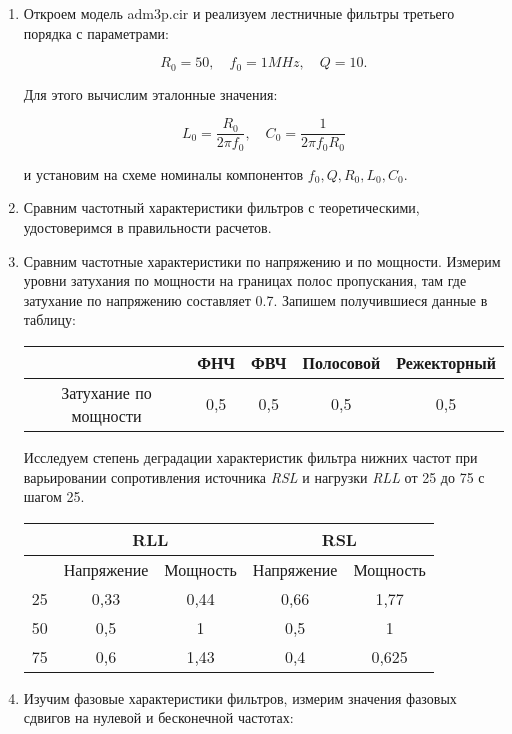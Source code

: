 \documentclass[a4paper, 12pt]{article}%
\begin{document}
\begin{enumerate}

\item Откроем модель adm3p.cir и реализуем лестничные фильтры третьего порядка с параметрами:

\[R_0 = 50, \quad f_0 = 1MHz, \quad Q = 10.\]

Для этого вычислим эталонные значения:

\[L_0 = \frac{R_0}{2\pi f_0}, \quad C_0 = \frac{1}{2 \pi f_0 R_0}\]

и установим на схеме номиналы компонентов $f_0, Q, R_0, L_0, C_0$.

\item Сравним частотный характеристики фильтров с теоретическими, удостоверимся в правильности расчетов.

\item Сравним частотные характеристики по напряжению и по мощности. Измерим уровни затухания по мощности на границах полос пропускания, там где затухание по напряжению составляет 0.7. Запишем получившиеся данные в таблицу:

\begin{center}
\begin{tabular}{|c|c|c|c|c|}
\hline 
 & ФНЧ & ФВЧ & Полосовой & Режекторный \\ 
\hline 
Затухание по мощности & 0,5 & 0,5 & 0,5 & 0,5 \\ 
\hline 
\end{tabular} 
\end{center}

Исследуем степень деградации характеристик фильтра нижних частот при варьировании сопротивления источника \textit{RSL} и нагрузки \textit{RLL} от 25 до 75 с шагом 25.

\begin{center}
\begin{tabular}{|c|c|c|c|c|}
\hline 
 & \multicolumn{2}{c|}{RLL} & \multicolumn{2}{c|}{RSL} \\ 
\hline 
 & Напряжение & Мощность & Напряжение & Мощность \\ 
\hline 
25 & 0,33 & 0,44 & 0,66 & 1,77 \\ 
\hline 
50 & 0,5 & 1 & 0,5 & 1 \\ 
\hline 
75 & 0,6 & 1,43 & 0,4 & 0,625 \\ 
\hline 
\end{tabular} 
\end{center}

\item Изучим фазовые характеристики фильтров, измерим значения фазовых сдвигов на нулевой и бесконечной частотах:


\end{enumerate}
\end{document}
